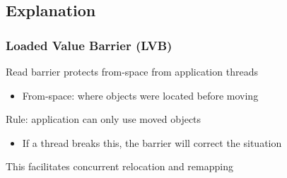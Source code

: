 \documentclass{beamer}
\newcommand{\linespace}{\vskip 0.25cm}
\begin{document}
\subsection*{Explanation}

\begin{frame}

\frametitle{Loaded Value Barrier (LVB)}

Read barrier protects from-space from application threads
\begin{itemize}
\item From-space: where objects were located before moving
\end{itemize}

\linespace
\linespace

Rule: application can only use moved objects
\begin{itemize}
\item If a thread breaks this, the barrier will correct the situation
\end{itemize}

\linespace
\linespace

This facilitates concurrent relocation and remapping

\end{frame}
\end{document}
